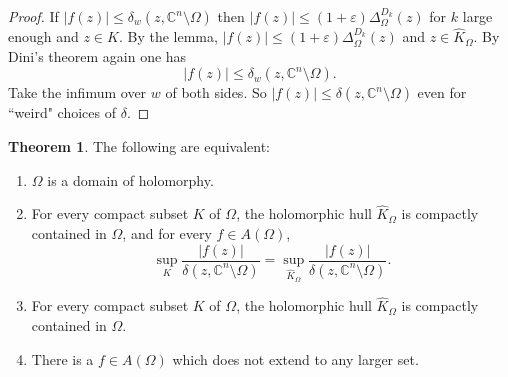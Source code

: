 \documentclass[12pt]{report}
\newcommand{\CC}{\mathbb{C}}
\theoremstyle{definition}
\newtheorem{theorem}{Theorem}[chapter]
\begin{document}
\begin{proof}
    If $|f(z)| \leq \delta_w(z, \CC^n \setminus \Omega)$ then $|f(z)| \leq (1 + \varepsilon) \Delta^{D_k}_\Omega(z)$ for $k$ large enough and $z \in K$. By the lemma, $|f(z)| \leq (1 + \varepsilon)\Delta_\Omega^{D_k}(z)$ and $z \in \hat K_\Omega$. By Dini's theorem again one has
    $$|f(z)| \leq \delta_w(z, \CC^n \setminus \Omega).$$
    Take the infimum over $w$ of both sides. So $|f(z)| \leq \delta(z, \CC^n \setminus \Omega)$ even for ``weird" choices of $\delta$.
\end{proof}


\begin{theorem}
The following are equivalent:
\begin{enumerate}
    \item $\Omega$ is a domain of holomorphy.
    \item For every compact subset $K$ of $\Omega$, the holomorphic hull $\hat K_\Omega$ is compactly contained in $\Omega$, and for every $f \in A(\Omega)$,
    $$\sup_K \frac{|f(z)|}{\delta(z, \CC^n \setminus \Omega)} = \sup_{\hat K_\Omega} \frac{|f(z)|}{\delta(z, \CC^n \setminus \Omega)}.$$
    \item For every compact subset $K$ of $\Omega$, the holomorphic hull $\hat K_\Omega$ is compactly contained in $\Omega$.
    \item There is a $f \in A(\Omega)$ which does not extend to any larger set.
\end{enumerate}
\end{theorem}
\end{document}
